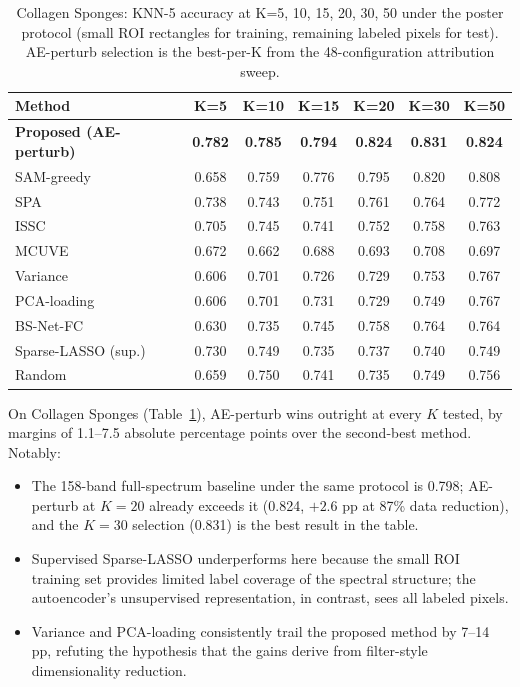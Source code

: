 \begin{table}[!t]
\centering
\caption{Collagen Sponges: KNN-5 accuracy at K=5, 10, 15, 20, 30, 50 under the poster protocol (small ROI rectangles for training, remaining labeled pixels for test). AE-perturb selection is the best-per-K from the 48-configuration attribution sweep.}
\label{tab:sota_pepsin}
\begin{tabular}{@{}lcccccc@{}}
\toprule
\textbf{Method} & \textbf{K=5} & \textbf{K=10} & \textbf{K=15} & \textbf{K=20} & \textbf{K=30} & \textbf{K=50} \\
\midrule
\textbf{Proposed (AE-perturb)} & \textbf{0.782} & \textbf{0.785} & \textbf{0.794} & \textbf{0.824} & \textbf{0.831} & \textbf{0.824} \\
\midrule
SAM-greedy & 0.658 & 0.759 & 0.776 & 0.795 & 0.820 & 0.808 \\
SPA~\cite{araujo2001spa} & 0.738 & 0.743 & 0.751 & 0.761 & 0.764 & 0.772 \\
ISSC~\cite{elhamifar2013ssc} & 0.705 & 0.745 & 0.741 & 0.752 & 0.758 & 0.763 \\
MCUVE~\cite{centner1996mcuve} & 0.672 & 0.662 & 0.688 & 0.693 & 0.708 & 0.697 \\
Variance & 0.606 & 0.701 & 0.726 & 0.729 & 0.753 & 0.767 \\
PCA-loading & 0.606 & 0.701 & 0.731 & 0.729 & 0.749 & 0.767 \\
BS-Net-FC~\cite{cai2020bsnet} & 0.630 & 0.735 & 0.745 & 0.758 & 0.764 & 0.764 \\
Sparse-LASSO (sup.) & 0.730 & 0.749 & 0.735 & 0.737 & 0.740 & 0.749 \\
Random & 0.659 & 0.750 & 0.741 & 0.735 & 0.749 & 0.756 \\
\bottomrule
\end{tabular}
\end{table}

On Collagen Sponges (Table~\ref{tab:sota_pepsin}), AE-perturb wins outright at every $K$ tested, by margins of 1.1--7.5 absolute percentage points over the second-best method. Notably:
\begin{itemize}
\item The 158-band full-spectrum baseline under the same protocol is 0.798; AE-perturb at $K=20$ already exceeds it (0.824, $+2.6$ pp at 87\% data reduction), and the $K=30$ selection (0.831) is the best result in the table.
\item Supervised Sparse-LASSO underperforms here because the small ROI training set provides limited label coverage of the spectral structure; the autoencoder's unsupervised representation, in contrast, sees all labeled pixels.
\item Variance and PCA-loading consistently trail the proposed method by 7--14 pp, refuting the hypothesis that the gains derive from filter-style dimensionality reduction.
\end{itemize}


